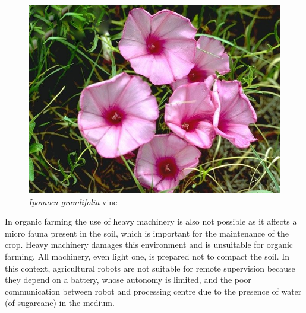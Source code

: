 \documentclass[
	12pt,				%
	oneside,			%
	a4paper,			%
	brazil,			    %
	french,				%
	spanish,			%
	english,			%
	]{abntex2}
\begin{document}
  \begin{figure}[htb]
	\caption{\label{fig:ipomoea}\textit{Ipomoea grandifolia} vine}
	\begin{center}
	    \includegraphics[scale=0.5]{images/Ipomoea_grandifolia76.jpg}
	\end{center}
\end{figure}

  
  
  In organic farming the use of heavy machinery is also not possible as it affects a micro fauna present in the soil, which is important for the maintenance of the crop. Heavy machinery damages this environment and is unsuitable for organic farming. All machinery, even light one, is prepared not to compact the soil. In this context, agricultural robots are not suitable for remote supervision because they depend on a battery, whose autonomy is limited, and the poor communication between robot and processing centre due to the presence of water (of sugarcane) in the medium.
  
\end{document}
